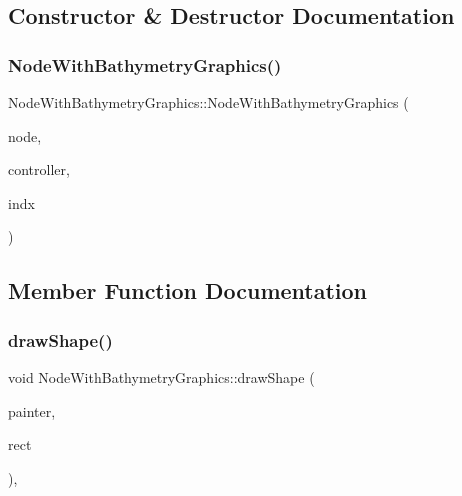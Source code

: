 \subsection{Constructor \& Destructor Documentation}
\mbox{\label{class_node_with_bathymetry_graphics_afb7a0ee012510ab131398ae83ee92417}} 
\subsubsection{\texorpdfstring{NodeWithBathymetryGraphics()}{NodeWithBathymetryGraphics()}}
{\footnotesize\ttfamily Node\+With\+Bathymetry\+Graphics\+::\+Node\+With\+Bathymetry\+Graphics (\begin{DoxyParamCaption}\item[{\mbox{\hyperlink{class_node_data}{Node\+Data}} $\ast$}]{node,  }\item[{\mbox{\hyperlink{class_map_objects_controller}{Map\+Objects\+Controller}} $\ast$}]{controller,  }\item[{int}]{indx }\end{DoxyParamCaption})\hspace{0.3cm}{\ttfamily [inline]}}



\subsection{Member Function Documentation}
\mbox{\label{class_node_with_bathymetry_graphics_a6ddfcf03efd428c475d2507b6c1b6b32}} 
\subsubsection{\texorpdfstring{drawShape()}{drawShape()}}
{\footnotesize\ttfamily void Node\+With\+Bathymetry\+Graphics\+::draw\+Shape (\begin{DoxyParamCaption}\item[{Q\+Painter \&}]{painter,  }\item[{const qmapcontrol\+::\+Rect\+World\+Px \&}]{rect }\end{DoxyParamCaption})\hspace{0.3cm}{\ttfamily [protected]}, {\ttfamily [virtual]}}



